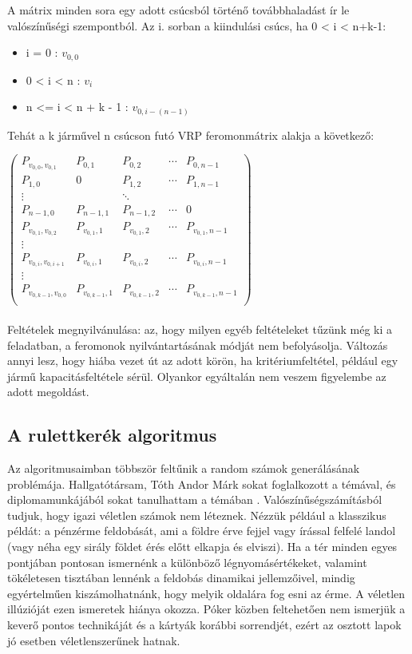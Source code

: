A mátrix minden sora egy adott csúcsból történő továbbhaladást ír le valószínűségi szempontból. Az i. sorban a kiindulási csúcs, ha 0 < i < n+k-1:
\begin{itemize}
	\item i = 0 :  \(v_{0,0}\)
	\item 0 < i < n : \(v_i\)
	\item n <= i < n + k - 1 :  \(v_{0,i-(n-1)}\)
\end{itemize}

Tehát a k járművel n csúcson futó VRP feromonmátrix alakja a következő:

$\begin{pmatrix}
	P_{v_{0,0},v_{0,1}} & P_{0,1} & P_{0,2} & \cdots & P_{0,n-1}\\ 
	P_{1,0} & 0 & P_{1,2} & \cdots & P_{1,n-1} \\
	\vdots & & \ddots \\
	P_{n-1,0} & P_{n-1,1} & P_{n-1,2} & \cdots & 0 \\
	P_{v_{0,1},v_{0,2}} & P_{v_{0,1},1} & P_{v_{0,1},2} & \cdots & P_{v_{0,1},n-1} \\
	\vdots & & \\
	P_{v_{0,i},v_{0,i+1}} & P_{v_{0,i},1} & P_{v_{0,i},2} & \cdots & P_{v_{0,i},n-1} \\
	\vdots & & \\
	P_{v_{0,k-1},v_{0,0}} & P_{v_{0,k-1},1} & P_{v_{0,k-1},2} & \cdots & P_{v_{0,k-1},n-1} \\
\end{pmatrix}$

\paragraph{}
Feltételek megnyilvánulása: az, hogy milyen egyéb feltételeket tűzünk még ki a feladatban, a feromonok nyilvántartásának módját nem befolyásolja. Változás annyi lesz, hogy hiába vezet út az adott körön, ha kritériumfeltétel, például egy jármű kapacitásfeltétele sérül. Olyankor egyáltalán nem veszem figyelembe az adott megoldást.



\subsection{A rulettkerék algoritmus }
Az algoritmusaimban többször feltűnik a random számok generálásának problémája. Hallgatótársam, Tóth Andor Márk sokat foglalkozott a témával, és diplomamunkájából sokat tanulhattam a témában \cite{alg_optim}. Valószínűségszámításból tudjuk, hogy igazi véletlen számok nem léteznek. Nézzük például a klasszikus példát: a pénzérme feldobását, ami a földre érve fejjel vagy írással felfelé landol (vagy néha egy sirály földet érés előtt elkapja és elviszi). Ha a tér minden egyes pontjában pontosan ismernénk a különböző légnyomásértékeket, valamint tökéletesen tisztában lennénk a feldobás dinamikai jellemzőivel, mindig egyértelműen kiszámolhatnánk, hogy melyik oldalára fog esni az érme. A véletlen illúzióját ezen ismeretek hiánya okozza. Póker közben feltehetően nem ismerjük a keverő pontos technikáját és a kártyák korábbi sorrendjét, ezért az osztott lapok jó esetben véletlenszerűnek hatnak. 

